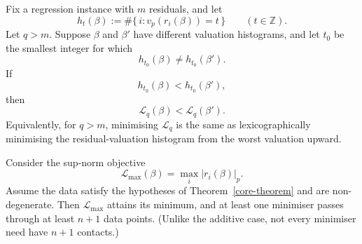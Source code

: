 \begin{thm}
\label{thm:q-lexicographic}
Fix a regression instance with \(m\) residuals, and let
\[
h_t(\beta):=\#\{\,i : v_p(r_i(\beta))=t\,\}
\qquad (t\in\mathbb{Z}).
\]
Let \(q>m\). Suppose \(\beta\) and \(\beta'\) have different valuation
histograms, and let \(t_0\) be the smallest integer for which
\[
h_{t_0}(\beta)\neq h_{t_0}(\beta').
\]
If
\[
h_{t_0}(\beta)<h_{t_0}(\beta'),
\]
then
\[
\mathcal{L}_q(\beta)<\mathcal{L}_q(\beta').
\]
Equivalently, for \(q>m\), minimising \(\mathcal{L}_q\) is the same as
lexicographically minimising the residual-valuation histogram from the worst
valuation upward.
\end{thm}

\begin{thm}
\label{thm:max-contact-existence}
Consider the sup-norm objective
\[
\mathcal{L}_{\max}(\beta)=\max_{i}|r_i(\beta)|_p.
\]
Assume the data satisfy the hypotheses of Theorem~\ref{core-theorem} and are
non-degenerate. Then \(\mathcal{L}_{\max}\) attains its minimum, and at least one
minimiser passes through at least \(n+1\) data points. (Unlike the additive
case, not every minimiser need have \(n+1\) contacts.)
\end{thm}

